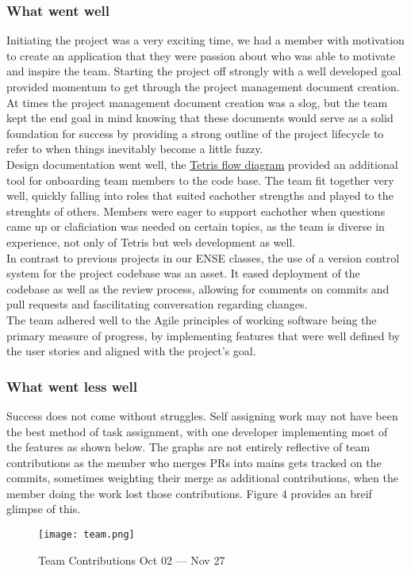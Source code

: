 \documentclass[english,course]{lecture}
\begin{document}
\subsubsection*{What went well}
Initiating the project was a very exciting time, we had a member with motivation to create an application that they were passion about who was able to motivate and inspire the team. Starting the project off strongly with a well developed goal provided momentum to get through the project management document creation.
%
\\At times the project management document creation was a slog, but the team kept the end goal in mind knowing that these documents would serve as a solid foundation for success by providing a strong outline of the project lifecycle to refer to when things inevitably become a little fuzzy.
%
\\Design documentation went well, the \href{https://github.com/teamcrusher/threewide/blob/main/Design%20documentation/Diagrams/Tetris-flow.md}{Tetris flow diagram}
provided an additional tool for onboarding team members to the code base. The team fit together very well, quickly falling into roles that suited eachother strengths and played to the strenghts of others. Members were eager to support eachother when questions came up or claficiation was needed on certain topics, as the team is diverse in experience, not only of Tetris but web development as well.
%
\\In contrast to previous projects in our ENSE classes, the use of a version control system for the project codebase was an asset. It eased deployment of the codebase as well as the review process, allowing for comments on commits and pull requests and fascilitating conversation regarding changes.
%
\\The team adhered well to the Agile principles of working software being the primary measure of progress, by implementing features that were well defined by the user stories and aligned with the project's goal.
%
\subsubsection*{What went less well}
Success does not come without struggles. Self assigning work may not have been the best method of task assignment, with one developer implementing most of the features as shown below. The graphs are not entirely reflective of team contributions as the member who merges PRs into mains gets tracked on the commits, sometimes weighting their merge as additional contributions, when the member doing the work lost those contributions. Figure 4 provides an breif glimpse of this.
%
\begin{figure}[H]
  \centering
  \texttt{[image: team.png]}
  \caption{Team Contributions Oct 02 --- Nov 27}\label{teamcontributions}
\end{figure}
%
\end{document}
